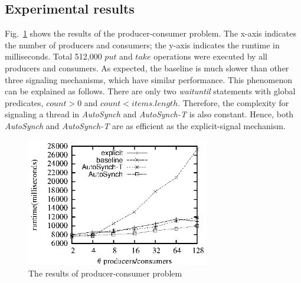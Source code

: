 \documentclass[preprint]{sigplanconf}
\begin{document}
%
\subsection{Experimental results}


Fig.~\ref{fig:pc_eval} shows the results of the producer-consumer problem. The 
x-axis indicates the number of producers and consumers; the y-axis indicates 
the runtime in milliseconds. Total 
512,000 $put$ and $take$ operations were executed by
all producers and consumers. As expected, the baseline is much slower than
other three signaling mechanisms, which have similar performance. This 
phenomenon can be explained as follows. There are only two {\em waituntil} statements 
with global predicates, $count > 0$ and $count < items.length$. Therefore, the 
complexity for signaling a thread in {\em AutoSynch} and {\em AutoSynch-T} is also constant. 
Hence, both {\em AutoSynch} and {\em AutoSynch-T} are as efficient as the explicit-signal 
mechanism. 

\begin{figure}[ht!]
  \centering
  \includegraphics[width=80mm]{fig/pc.eps}
  \caption{The results of producer-consumer problem}
  \label{fig:pc_eval}
\end{figure}
\end{document}
